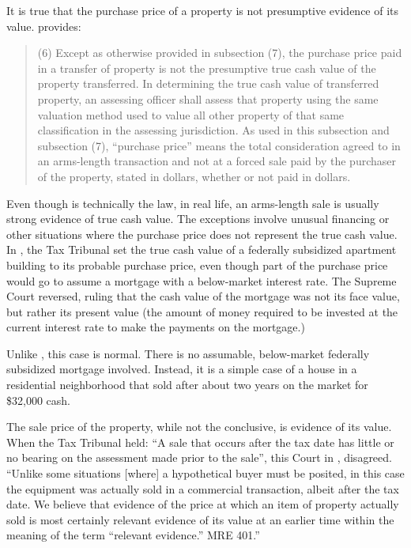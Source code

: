 \documentclass[12pt,\documentclassflag]{michiganCourtOfAppealsBrief}
\begin{document}
It is true that the purchase price of a property is not presumptive evidence of its value.  provides: 

\begin{quote} (6) Except as otherwise provided in subsection (7), the purchase price paid in a transfer of property is not the presumptive true cash value of the property transferred. In determining the true cash value of transferred property, an assessing officer shall assess that property using the same valuation method used to value all other property of that same classification in the assessing jurisdiction. As used in this subsection and subsection (7), ``purchase price'' means the total consideration agreed to in an arms-length transaction and not at a forced sale paid by the purchaser of the property, stated in dollars, whether or not paid in dollars.
\end{quote}

Even though  is technically the law, in real life, an arms-length sale is usually strong evidence of true cash value. The exceptions involve unusual financing or other situations where the purchase price does not represent the true cash value. In \cite[s]{Antisdale}, the Tax Tribunal set the true cash value of a federally subsidized apartment building to its probable purchase price, even though part of the purchase price would go to assume a mortgage with a below-market interest rate. The Supreme Court reversed, ruling that the cash value of the mortgage was not its face value, but rather its present value (the amount of money required to be invested at the current interest rate to make the payments on the mortgage.) 

Unlike \cite[s]{Antisdale}, this case is normal. There is no assumable, below-market federally subsidized mortgage involved. Instead, it is a simple case of a house in a residential neighborhood that sold after about two years on the market for \$32,000 cash.

The sale price of the property, while not the conclusive, is evidence of its value. When the Tax Tribunal held: ``A sale that occurs after the tax date has little or no bearing on the assessment made prior to the sale'', this Court in , disagreed. ``Unlike some situations [where] a hypothetical buyer must be posited, in this case the equipment was actually sold in a commercial transaction, albeit after the tax date. We believe that evidence of the price at which an item of property actually sold is most certainly relevant evidence of its value at an earlier time within the meaning of the term ``relevant evidence.'' MRE 401.''
\end{document}
